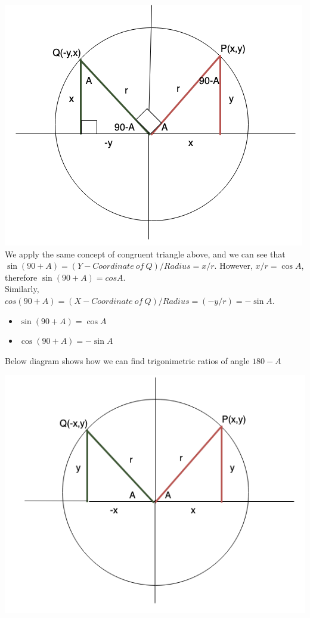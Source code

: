 \documentclass{book}
\begin{document}
	\includegraphics[scale=0.6]{compangle1} \\
	
	
	We apply the same concept of congruent triangle above, and we can see that $\sin(90+A) = (Y-Coordinate \: of \: Q)/Radius = x/r$. However, $x/r = \cos{A}$, therefore $\sin(90+A)=cos{A}$. \\
	Similarly, $cos(90+A) = (X-Coordinate \: of \: Q)/Radius = (-y/r) = -\sin{A}$. \\
	
	\begin{mdframed}[backgroundcolor=yellow]
		\begin{itemize}
			\item$\sin(90+A) = \cos{A}$
			\item $\cos(90+A) = -\sin{A}$
			
		\end{itemize}
	\end{mdframed}

	Below diagram shows how we can find trigonimetric ratios of angle $180-A$
	
	\includegraphics[scale=0.6]{180theta}
	
\end{document}

